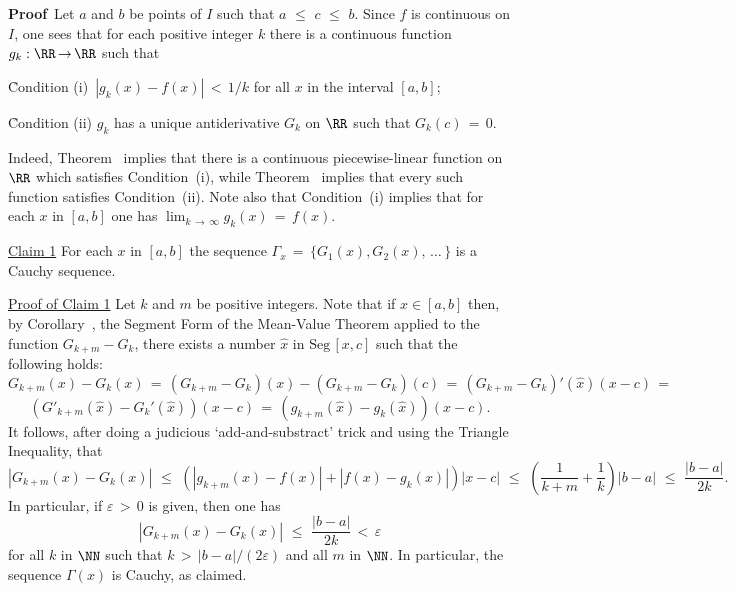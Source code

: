\V

        {\bf Proof}\, Let $a$ and $b$ be points of $I$ such that $a\,\,{\leq}\,\,c\,\,{\leq}\,\,b$.
    Since $f$ is continuous on $I$, one sees that for each positive integer $k$ there is a continuous function $g_{k}:{\RR} \,{\rightarrow}\, {\RR}$ such that

\VA

        \h Condition (i)\, $|g_{k}(x) - f(x)|\,<\,1/k$ for all $x$ in the interval $[a,b]$;

        \h Condition (ii) $g_{k}$ has a unique antiderivative $G_{k}$ on ${\RR}$ such that $G_{k}(c) \,=\, 0$.

\VA%

\hspace*{\parindent}Indeed, Theorem~ implies that there is a continuous piecewise-linear function on ${\RR}$ which satisfies Condition~(i),
    while Theorem~ implies that every such function satisfies Condition~(ii). Note also that Condition~(i)
    implies that for each $x$ in $[a,b]$ one has ${\displaystyle \lim_{k \,{\rightarrow}\, {\infty}} g_{k}(x) \,=\, f(x)}$.

\V

        \underline{Claim 1} For each $x$ in $[a,b]$ the sequence ${\Gamma}_{x} \,=\, \{G_{1}(x), G_{2}(x),\,{\ldots}\,\}$ is a Cauchy sequence.

        \underline{Proof of Claim 1} Let $k$ and $m$ be positive integers. Note that if $x{\in}[a,b]$ then, by Corollary~,
    the Segment Form of the Mean-Value Theorem applied to the function $G_{k+m} - G_{k}$, there exists a number $\hat{x}$ in ${\mbox{Seg}\,[x,c]}$ such that the following holds:
        \begin{displaymath}
        G_{k+m}(x) - G_{k}(x) \,=\, (G_{k+m} - G_{k})(x) - (G_{k+m} - G_{k})(c)
     \,=\, 
        (G_{k+m} - G_{k})'(\hat{x})(x-c) \,=\,
        \end{displaymath}
        \begin{displaymath}
         (G'_{k+m}(\hat{x}) - G_{k}'(\hat{x}))(x-c)
     \,=\, 
       (g_{k+m}(\hat{x}) - g_{k}(\hat{x}))(x-c).
        \end{displaymath}
    It follows, after doing a judicious `add-and-substract' trick and using the Triangle Inequality, that
        \begin{displaymath}
        |G_{k+m}(x) - G_{k}(x)|\,\,{\leq}\,\,\left(|g_{k+m}(x) - f(x)| + |f(x) - g_{k}(x)|\right)|x-c|\,\,{\leq}\,\,\left(\frac{1}{k+m} + \frac{1}{k}\right)|b-a|\,\,{\leq}\,\,\frac{|b-a|}{2k}.
        \end{displaymath}
    In particular, if ${\varepsilon}\,>\,0$ is given, then one has
        \begin{equation}
        \label{IneqE.83A}
        |G_{k+m}(x) - G_{k}(x)|\,\,{\leq}\,\,\frac{|b-a|}{2k}\,<\,{\varepsilon}
        \end{equation}
    for all $k$ in ${\NN}$ such that $k\,>\,|b-a|/(2{\varepsilon})$ and all $m$ in ${\NN}$. In particular, the sequence ${\Gamma}(x)$ is Cauchy, as claimed.

